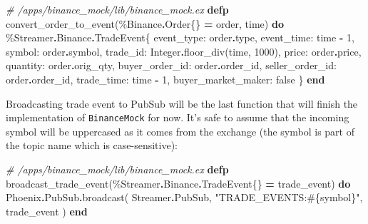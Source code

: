 \documentclass[
  oneside]{book}
\newenvironment{Shaded}{\begin{snugshade}}{\end{snugshade}}
\newcommand{\CommentTok}[1]{\textcolor[rgb]{0.56,0.35,0.01}{\textit{#1}}}
\newcommand{\ConstantTok}[1]{\textcolor[rgb]{0.00,0.00,0.00}{#1}}
\newcommand{\DecValTok}[1]{\textcolor[rgb]{0.00,0.00,0.81}{#1}}
\newcommand{\KeywordTok}[1]{\textcolor[rgb]{0.13,0.29,0.53}{\textbf{#1}}}
\newcommand{\NormalTok}[1]{#1}
\newcommand{\OperatorTok}[1]{\textcolor[rgb]{0.81,0.36,0.00}{\textbf{#1}}}
\newcommand{\OtherTok}[1]{\textcolor[rgb]{0.56,0.35,0.01}{#1}}
\newcommand{\StringTok}[1]{\textcolor[rgb]{0.31,0.60,0.02}{#1}}
\newcommand{\VariableTok}[1]{\textcolor[rgb]{0.00,0.00,0.00}{#1}}
\begin{document}
\begin{Shaded}
\begin{Highlighting}[]
\CommentTok{\# /apps/binance\_mock/lib/binance\_mock.ex}
  \KeywordTok{defp}\NormalTok{ convert\_order\_to\_event(\%}\ConstantTok{Binance}\OperatorTok{.}\ConstantTok{Order}\NormalTok{\{\} }\OperatorTok{=}\NormalTok{ order, time) }\KeywordTok{do}
\NormalTok{    \%}\ConstantTok{Streamer}\OperatorTok{.}\ConstantTok{Binance}\OperatorTok{.}\ConstantTok{TradeEvent}\NormalTok{\{}
      \VariableTok{event\_type:}\NormalTok{ order}\OperatorTok{.}\NormalTok{type,}
      \VariableTok{event\_time:}\NormalTok{ time }\OperatorTok{{-}} \DecValTok{1}\NormalTok{,}
      \VariableTok{symbol:}\NormalTok{ order}\OperatorTok{.}\NormalTok{symbol,}
      \VariableTok{trade\_id:} \ConstantTok{Integer}\OperatorTok{.}\NormalTok{floor\_div(time, }\DecValTok{1000}\NormalTok{),}
      \VariableTok{price:}\NormalTok{ order}\OperatorTok{.}\NormalTok{price,}
      \VariableTok{quantity:}\NormalTok{ order}\OperatorTok{.}\NormalTok{orig\_qty,}
      \VariableTok{buyer\_order\_id:}\NormalTok{ order}\OperatorTok{.}\NormalTok{order\_id,}
      \VariableTok{seller\_order\_id:}\NormalTok{ order}\OperatorTok{.}\NormalTok{order\_id,}
      \VariableTok{trade\_time:}\NormalTok{ time }\OperatorTok{{-}} \DecValTok{1}\NormalTok{,}
      \VariableTok{buyer\_market\_maker:} \ConstantTok{false}
\NormalTok{    \}}
  \KeywordTok{end}
\end{Highlighting}
\end{Shaded}

Broadcasting trade event to PubSub will be the last function that will finish
the implementation of \texttt{BinanceMock} for now. It's safe to assume that the incoming
symbol will be uppercased as it comes from the exchange (the symbol is part of the topic name which is case-sensitive):

\begin{Shaded}
\begin{Highlighting}[]
\CommentTok{\# /apps/binance\_mock/lib/binance\_mock.ex}
  \KeywordTok{defp}\NormalTok{ broadcast\_trade\_event(\%}\ConstantTok{Streamer}\OperatorTok{.}\ConstantTok{Binance}\OperatorTok{.}\ConstantTok{TradeEvent}\NormalTok{\{\} }\OperatorTok{=}\NormalTok{ trade\_event) }\KeywordTok{do}
    \ConstantTok{Phoenix}\OperatorTok{.}\ConstantTok{PubSub}\OperatorTok{.}\NormalTok{broadcast(}
      \ConstantTok{Streamer}\OperatorTok{.}\ConstantTok{PubSub}\NormalTok{,}
      \StringTok{"TRADE\_EVENTS:}\OtherTok{\#\{}\NormalTok{symbol}\OtherTok{\}}\StringTok{"}\NormalTok{,}
\NormalTok{      trade\_event}
\NormalTok{    )}
  \KeywordTok{end}
\end{Highlighting}
\end{Shaded}
\end{document}
